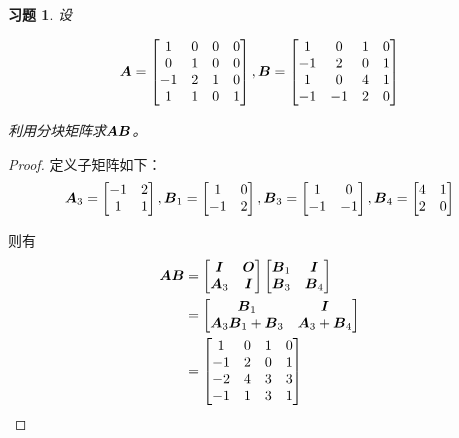 \documentclass{ctexart}
\newtheorem{problem}{习题}[section]
\begin{document}
\begin{problem}
设

\begin{equation*}
    \boldsymbol{A}=\begin{bmatrix}1&0&0&0\\0&1&0&0\\-1&2&1&0\\1&1&0&1\end{bmatrix},
    \boldsymbol{B}=\begin{bmatrix}1&0&1&0\\-1&2&0&1\\1&0&4&1\\-1&-1&2&0\end{bmatrix}
\end{equation*}

利用分块矩阵求\(\boldsymbol{A}\boldsymbol{B}\)。
\end{problem}
\begin{proof}
    定义子矩阵如下：
    \begin{equation*}
        \boldsymbol{A}_3=
        \begin{bmatrix}
            -1 & 2 \\1&1
        \end{bmatrix},
        \boldsymbol{B}_1=
        \begin{bmatrix}
            1 & 0 \\-1&2
        \end{bmatrix},
        \boldsymbol{B}_3=
        \begin{bmatrix}
            1 & 0 \\-1&-1
        \end{bmatrix},
        \boldsymbol{B}_4=
        \begin{bmatrix}
            4 & 1 \\2&0
        \end{bmatrix}
    \end{equation*}

    则有
    \begin{align*}
        \boldsymbol{A}\boldsymbol{B} & =
        \begin{bmatrix}
            \boldsymbol{I} & \boldsymbol{O} \\\boldsymbol{A}_3&\boldsymbol{I}
        \end{bmatrix}
        \begin{bmatrix}
            \boldsymbol{B}_1 & \boldsymbol{I} \\\boldsymbol{B}_3&\boldsymbol{B}_4
        \end{bmatrix} \\&=
        \begin{bmatrix}
            \boldsymbol{B}_1 & \boldsymbol{I} \\\boldsymbol{A}_3\boldsymbol{B}_1+\boldsymbol{B}_3&\boldsymbol{A}_3+\boldsymbol{B}_4
        \end{bmatrix} \\&=
        \begin{bmatrix}
            1  & 0 & 1 & 0 \\
            -1 & 2 & 0 & 1 \\
            -2 & 4 & 3 & 3 \\
            -1 & 1 & 3 & 1
        \end{bmatrix}
    \end{align*}
\end{proof}
\end{document}
